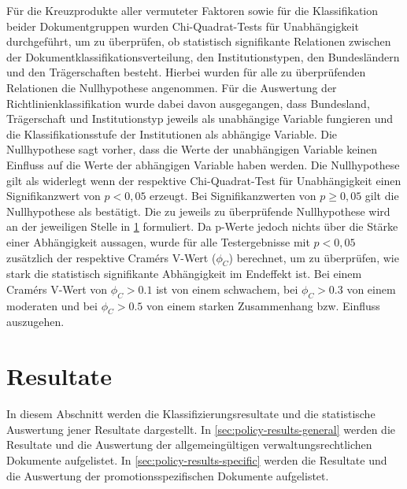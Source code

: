 Für die Kreuzprodukte aller vermuteter Faktoren sowie für die Klassifikation beider Dokumentgruppen wurden Chi-Quadrat-Tests für Unabhängigkeit durchgeführt, um zu überprüfen, ob statistisch signifikante Relationen zwischen der Dokumentklassifikationsverteilung, den Institutionstypen, den Bundesländern und den Trägerschaften besteht.
Hierbei wurden für alle zu überprüfenden Relationen die Nullhypothese angenommen.
Für die Auswertung der Richtlinienklassifikation wurde dabei davon ausgegangen, dass Bundesland, Trägerschaft und Institutionstyp jeweils als unabhängige Variable fungieren und die Klassifikationsstufe der Institutionen als abhängige Variable.
Die Nullhypothese sagt vorher, dass die Werte der unabhängigen Variable keinen Einfluss auf die Werte der abhängigen Variable haben werden.
Die Nullhypothese gilt als widerlegt wenn der respektive Chi-Quadrat-Test für Unabhängigkeit einen Signifikanzwert von $p<0,05$ erzeugt.
Bei Signifikanzwerten von $p\geqslant0,05$ gilt die Nullhypothese als bestätigt.
Die zu jeweils zu überprüfende Nullhypothese wird an der jeweiligen Stelle in \cref{sec:policy-results} formuliert.
Da p-Werte jedoch nichts über die Stärke einer Abhängigkeit aussagen, wurde für alle Testergebnisse mit $p<0,05$ zusätzlich der respektive Cramérs V-Wert ($\phi_C$) berechnet, um zu überprüfen, wie stark die statistisch signifikante Abhängigkeit im Endeffekt ist.
Bei einem Cramérs V-Wert von $\phi_C>\num{0,1}$ ist von einem schwachem, bei $\phi_C>\num{0,3}$ von einem moderaten und bei $\phi_C>\num{0,5}$ von einem starken Zusammenhang bzw. Einfluss auszugehen.

\section{Resultate}\label{sec:policy-results}
In diesem Abschnitt werden die Klassifizierungsresultate und die statistische Auswertung jener Resultate dargestellt.
In \cref{sec:policy-results-general} werden die Resultate und die Auswertung der allgemeingültigen verwaltungsrechtlichen Dokumente aufgelistet.
In \cref{sec:policy-results-specific} werden die Resultate und die Auswertung der promotionsspezifischen Dokumente aufgelistet.

